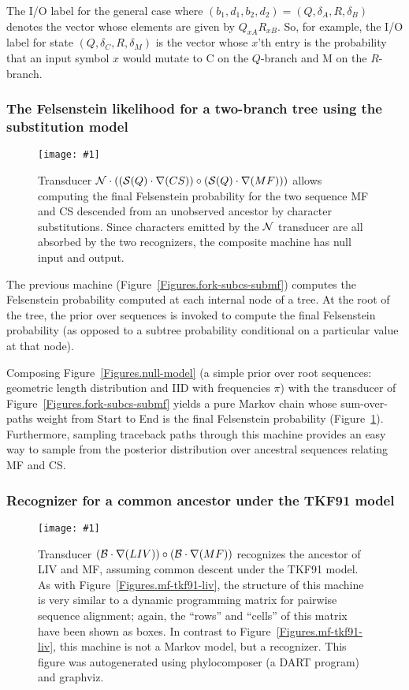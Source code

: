 \documentclass{article}
\newcommand{\figref}[1]{Figure~\ref{Figures.#1}}
\newcommand{\figlabel}[1]{\label{Figures.#1}}
\newcommand{\easyfig}[4]{
\begin{figure}
\texttt{[image: \#1]}
\caption{ \figlabel{#3} #4}
\end{figure}}
\newcommand{\pdffig}[2]{\easyfig{#1-fig.pdf}{}{#1}{#2}}
\newcommand{\widepdffig}[2]{\easyfig{#1-fig.pdf}{width=\textwidth}{#1}{#2}}
\newcommand\nullmodel{{\cal N}}
\newcommand\substitute{{\cal S}}
\newcommand\tkf{{\cal B}}
\newcommand\fork{\circ}
\newcommand\recognize{\nabla}
\begin{document}
The I/O label for the general case where $(b_1,d_1,b_2,d_2) = (Q,\delta_A,R,\delta_B)$
denotes the vector whose elements are given by $Q_{xA} R_{xB}$.
So, for example,
the I/O label for state $(Q,\delta_C,R,\delta_M)$
is the vector whose $x$'th entry is the probability that an input symbol $x$
would mutate to C on the $Q$-branch and M on the $R$-branch.

\subsubsection{The Felsenstein likelihood for a two-branch tree using the substitution model}

\pdffig{root-fork-subcs-submf}{Transducer $\nullmodel \cdot ((\substitute(Q) \cdot \recognize(CS))\fork(\substitute(Q) \cdot \recognize(MF)))$ 
allows computing  the final Felsenstein probability for the two sequence MF and CS descended from an unobserved ancestor
by character substitutions.  Since characters emitted by the $\nullmodel$ transducer are
all absorbed by the two recognizers, the composite machine has null input and output.  }

The previous machine (\figref{fork-subcs-submf}) computes the Felsenstein probability computed at each internal
node of a tree.  
At the root of the tree, the prior over sequences is invoked to compute the final Felsenstein
probability (as opposed to a subtree probability conditional on a particular value at that node).

Composing \figref{null-model} (a simple prior over root sequences: geometric length distribution and IID with frequencies $\pi$)
with the transducer of \figref{fork-subcs-submf}
yields a pure Markov chain
whose sum-over-paths weight from Start to End is the final Felsenstein probability (\figref{root-fork-subcs-submf}).  
Furthermore, sampling traceback paths through this machine provides an easy
way to  sample from the  posterior distribution over ancestral sequences relating MF and CS.  

\subsubsection{Recognizer for a common ancestor under the TKF91 model}

\widepdffig{fork-tkf91liv-tkf91mf}{Transducer $(\tkf \cdot \recognize(LIV))\fork(\tkf \cdot \recognize(MF))$ recognizes the ancestor of LIV and MF, assuming common descent under the TKF91 model.  
As with \figref{mf-tkf91-liv}, the structure of this machine is very similar to a dynamic programming matrix for pairwise sequence alignment; again, the ``rows'' and ``cells'' of this matrix have been shown as boxes.
In contrast to \figref{mf-tkf91-liv}, this machine is not a Markov model, but a recognizer.
This figure was autogenerated using phylocomposer (a DART program) and graphviz.} 
\end{document}

